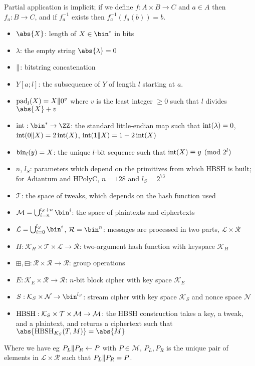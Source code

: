 \documentclass[eprint.tex]{subfiles}
\begin{document}
Partial application is implicit; if we define $f: A \times B \rightarrow C$ and
$a \in A$ then $f_a: B \rightarrow C$, and if $f_a^{-1}$ exists then $f_a^{-1}(f_a(b)) = b$.
\begin{itemize}
    \item $\abs{X}$: length of $X \in \bin^{*}$ in bits
    \item $\lambda$: the empty string $\abs{\lambda} = 0$
    \item $\Vert$: bitstring concatenation
    \item $Y[a;l]$: the subsequence of $Y$ of length $l$ starting at $a$.
    \item $\operatorname{pad}_l(X) = X \Vert 0^v$
    where $v$ is the least integer $\geq 0$ such that $l$ divides $\abs{X} + v$
    \item $\intify: \bin^{*} \rightarrow \ZZ$: the
    standard little-endian map such that
    $\operatorname{int}(\lambda) = 0$, $\operatorname{int}(0 \Vert X) = 2\operatorname{int}(X)$, $\operatorname{int}(1 \Vert X) = 1 + 2\operatorname{int}(X)$
    \item $\operatorname{bin}_l(y) = X$: the unique
    $l$-bit sequence such that $\operatorname{int}(X) \equiv y \pmod{2^l}$
    \item $n$, $l_S$: parameters which depend on the
    primitives from which HBSH is built;
    for Adiantum and HPolyC, $n = 128$ and $l_S = 2^{73}$
    \item $\mathcal{T}$: the
    space of tweaks, which depends on the hash function used
    \item $\mathcal{M} = \bigcup_{i=n}^{l_S + n}\bin^i$: the
    space of plaintexts and ciphertexts
    \item $\mathcal{L} = \bigcup_{i=0}^{l_S}\bin^i$, $\mathcal{R} = \bin^n$:
    messages are processed in two parts,
    $\mathcal{L} \times \mathcal{R}$
    \item $H: \mathcal{K}_H \times \mathcal{T} \times \mathcal{L} \rightarrow \mathcal{R}$:
    two-argument hash function with keyspace $\mathcal{K}_H$
    \item $\boxplus, \boxminus: \mathcal{R} \times \mathcal{R} \rightarrow \mathcal{R}$:
    group operations
    \item $E: \mathcal{K}_E \times \mathcal{R} \rightarrow \mathcal{R}$:
    $n$-bit block cipher with key space $\mathcal{K}_E$
    \item $S: \mathcal{K}_S \times \mathcal{N} \rightarrow \bin^{l_S}$:
    stream cipher with key space $\mathcal{K}_S$
    and nonce space $\mathcal{N}$
    \item $\operatorname{HBSH} : \mathcal{K}_S \times \mathcal{T} \times \mathcal{M} \rightarrow \mathcal{M}$:
    the HBSH construction takes a key, a tweak, and a plaintext,
    and returns a ciphertext
    such that $\abs{\HBSH_{K_S}(T, M)} = \abs{M}$
\end{itemize}
Where we have eg $P_L \Vert P_R \gets P$
with $P \in \mathcal{M}$, $P_L, P_R$ is the unique
pair of elements in $\mathcal{L} \times \mathcal{R}$ such that
$P_L \Vert P_R = P$.
\end{document}
